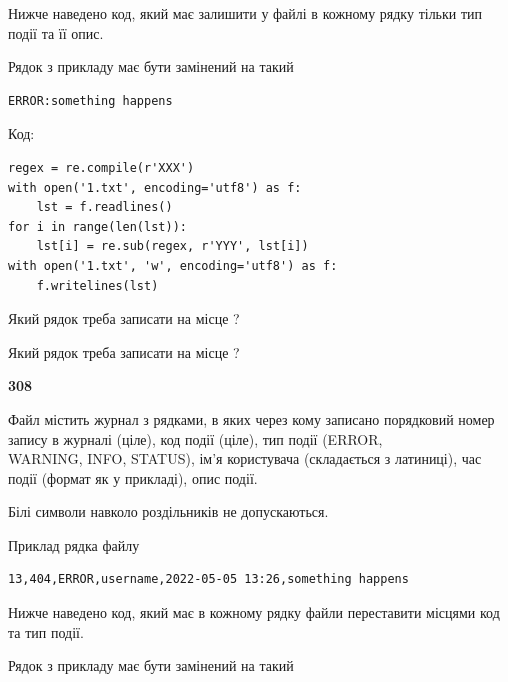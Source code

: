 Нижче наведено код, який має залишити у файлі в кожному рядку тільки тип події та її опис.

Рядок з прикладу має бути замінений на такий



\begin{verbatim}
ERROR:something happens
\end{verbatim}




Код:



\begin{verbatim}
regex = re.compile(r'XXX')
with open('1.txt', encoding='utf8') as f:
    lst = f.readlines()
for i in range(len(lst)):
    lst[i] = re.sub(regex, r'YYY', lst[i])
with open('1.txt', 'w', encoding='utf8') as f:
    f.writelines(lst)
\end{verbatim}









Який рядок треба записати на місце  ?\par
\vspace{5mm}


Який рядок треба записати на місце  ?\par


\newpage

{\begin {center}\textbf{ 308}\end {center}}\par
Файл  містить журнал з рядками, в яких через кому записано поряд\-ко\-вий номер запису в журналі (ціле), код події (ціле), тип події (ERROR,\\ WARNING, INFO, STATUS), ім'я користувача (складається з латиниці), час події (фор\-мат як у прикладі), опис події.

Білі символи навколо роздільників не допускаються.

Приклад рядка файлу



\begin{verbatim}
13,404,ERROR,username,2022-05-05 13:26,something happens
\end{verbatim}


Нижче наведено код, який має в кожному рядку файли переставити місцями код та тип події.

Рядок з прикладу має бути замінений на такий



